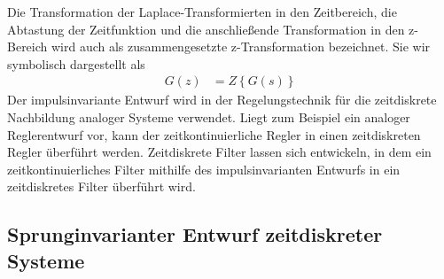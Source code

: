 Die Transformation der Laplace-Transformierten in den Zeitbereich, die Abtastung der Zeitfunktion und die anschließende Transformation in den z-Bereich wird auch als zusammengesetzte z-Transformation bezeichnet. Sie wir symbolisch dargestellt als
\begin{align}
G(z) &= Z\left\{ G(s) \right\} \label{eq:9.11}
\end{align}
Der impulsinvariante Entwurf wird in der Regelungstechnik für die zeitdiskrete Nachbildung analoger Systeme verwendet. Liegt zum Beispiel ein analoger Reglerentwurf vor, kann der zeitkontinuierliche Regler in einen zeitdiskreten Regler überführt werden. Zeitdiskrete Filter lassen sich entwickeln, in dem ein zeitkontinuierliches Filter mithilfe des impulsinvarianten Entwurfs in ein zeitdiskretes Filter überführt wird.

\subsection{Sprunginvarianter Entwurf zeitdiskreter Systeme}\label{sec:sprunginvarianter-entwurf-zeitdiskreter-systeme}

